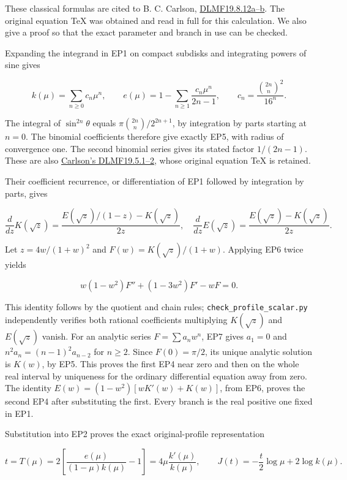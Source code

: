 \documentclass[10pt]{article}
\begin{document}
These classical formulas are cited to B. C. Carlson, \href{https://dlmf.nist.gov/19.8.E12}{DLMF19.8.12a--b}. The original equation TeX was obtained and read in full for this calculation. We also give a proof so that the exact parameter and branch in use can be checked.

Expanding the integrand in EP1 on compact subdisks and integrating powers of sine gives

\[
 k(\mu)=\sum_{n\ge0}c_n\mu^n,\qquad
 e(\mu)=1-\sum_{n\ge1}\frac{c_n\mu^n}{2n-1},\qquad
 c_n=\frac{\binom{2n}{n}^2}{16^n}.
 \tag{EP5}
\]

The integral of \(\sin^{2n}\theta\) equals \(\pi\binom{2n}{n}/2^{2n+1}\), by integration by parts starting at \(n=0\). The binomial coefficients therefore give exactly EP5, with radius of convergence one. The second binomial series gives its stated factor \(1/(2n-1)\). These are also \href{https://dlmf.nist.gov/19.5}{Carlson's DLMF19.5.1--2}, whose original equation TeX is retained.

Their coefficient recurrence, or differentiation of EP1 followed by integration by parts, gives

\[
 \frac{d}{dz}K(\sqrt z)=\frac{E(\sqrt z)/(1-z)-K(\sqrt z)}{2z},\quad
 \frac{d}{dz}E(\sqrt z)=\frac{E(\sqrt z)-K(\sqrt z)}{2z}.
 \tag{EP6}
\]

Let \(z=4w/(1+w)^2\) and \(F(w)=K(\sqrt z)/(1+w)\). Applying EP6 twice yields

\[
 w(1-w^2)F''+(1-3w^2)F'-wF=0.
 \tag{EP7}
\]

This identity follows by the quotient and chain rules; \texttt{check\_profile\_scalar.py} independently verifies both rational coefficients multiplying \(K(\sqrt z)\) and \(E(\sqrt z)\) vanish. For an analytic series \(F=\sum a_nw^n\), EP7 gives \(a_1=0\) and \(n^2a_n=(n-1)^2a_{n-2}\) for \(n\ge2\). Since \(F(0)=\pi/2\), its unique analytic solution is \(K(w)\), by EP5. This proves the first EP4 near zero and then on the whole real interval by uniqueness for the ordinary differential equation away from zero. The identity \(E(w)=(1-w^2)[wK'(w)+K(w)]\), from EP6, proves the second EP4 after substituting the first. Every branch is the real positive one fixed in EP1.

Substitution into EP2 proves the exact original-profile representation

\[
 \boxed{t=T(\mu)=2\left[\frac{e(\mu)}{(1-\mu)k(\mu)}-1\right]
       =4\mu\frac{k'(\mu)}{k(\mu)},\qquad
 J(t)=-\frac t2\log\mu+2\log k(\mu).}
 \tag{EP8}
\]
\end{document}
